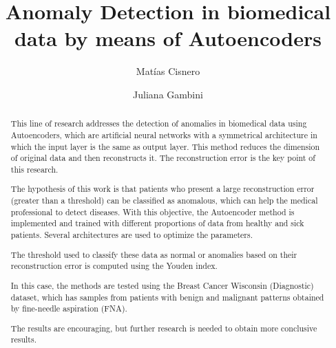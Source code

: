 \documentclass{llncs}
\begin{document}
%
\title{Anomaly Detection in biomedical data by means of Autoencoders}

%
\author{Matías Cisnero \and
Juliana Gambini}
%
%
%
\maketitle              %
%
\begin{abstract}
This line of research addresses the detection of anomalies in biomedical data using  Autoencoders, which are artificial neural networks with a symmetrical architecture in which the input layer is the same as output layer. 
This method reduces the dimension of original data and then reconstructs it. The reconstruction error is the key point of this research.

The hypothesis of this work is that patients who present a large reconstruction error (greater than a threshold) can be classified as anomalous, which can help the medical professional to detect diseases.
With this objective, the Autoencoder method is implemented
and trained with different proportions of data from healthy and sick patients. Several architectures are used to optimize the parameters.

The threshold used to classify these data as normal or anomalies based on their reconstruction error is computed using the Youden index.

In this case, the methods are tested using the
Breast Cancer Wisconsin (Diagnostic) dataset, which has samples from patients with benign and malignant patterns obtained by fine-needle aspiration (FNA).

The results are encouraging, but further research is needed to obtain more conclusive results.

\end{abstract}
\end{document}
